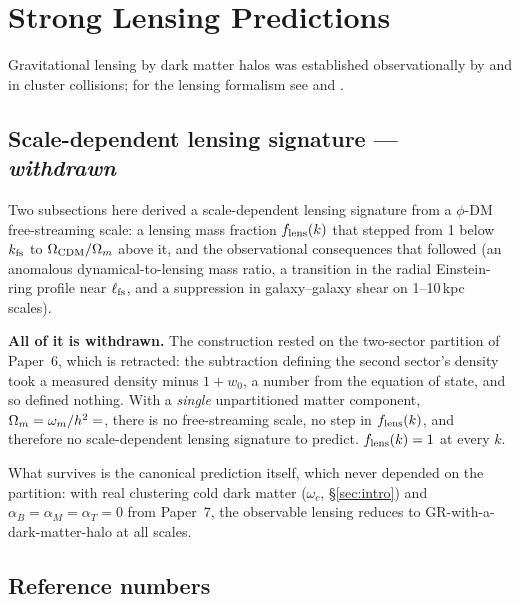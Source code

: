 \documentclass[12pt,a4paper]{article}
\begin{document}
\section{Strong Lensing Predictions}
\label{sec:lensing}

Gravitational lensing by dark matter halos was established observationally
by \citet{Bradac2006} and \citet{Clowe2006} in cluster collisions;
for the lensing formalism see \citet{Narayan1996} and \citet{Schneider1992}.

\subsection{Scale-dependent lensing signature --- \emph{withdrawn}}
\label{sec:twosector_signature_withdrawn}

Two subsections here derived a scale-dependent lensing signature from a
$\phi$-DM free-streaming scale: a lensing mass fraction $f_{\rm lens}(k)$ that
stepped from 1 below $k_{\rm fs}$ to $\Omega_{\rm CDM}/\Omega_m$ above it, and
the observational consequences that followed (an anomalous
dynamical-to-lensing mass ratio, a transition in the radial Einstein-ring
profile near $\ell_{\rm fs}$, and a suppression in galaxy--galaxy shear on
1--10\,kpc scales).

\textbf{All of it is withdrawn.} The construction rested on the two-sector
partition of Paper~6, which is retracted: the subtraction defining the second
sector's density took a measured density minus $1+w_0$, a number from the
equation of state, and so defined nothing. With a \emph{single} unpartitioned
matter component, $\Omega_m=\omega_m/h^2=\val{OMEGA_M_TOTAL_d6}$, there is no free-streaming
scale, no step in $f_{\rm lens}(k)$, and therefore no scale-dependent lensing
signature to predict. $f_{\rm lens}(k)=1$ at every $k$.

What survives is the canonical prediction itself, which never depended on the
partition: with real clustering cold dark matter ($\omega_c$, \S\ref{sec:intro})
and $\alpha_B=\alpha_M=\alpha_T=0$ from Paper~7, the observable lensing reduces
to GR-with-a-dark-matter-halo at all scales.

\subsection{Reference numbers}
\end{document}
